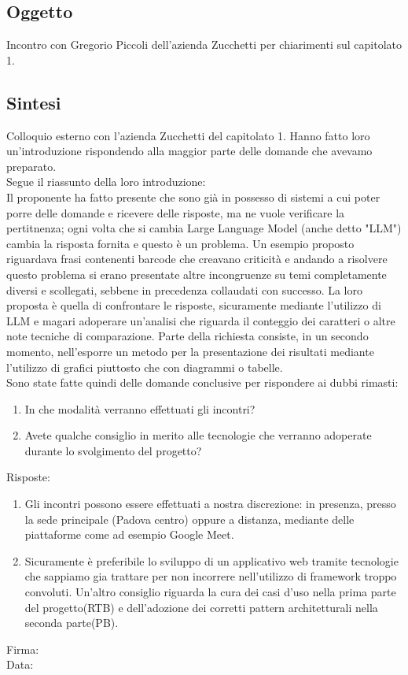 \documentclass[12pt]{article}
\begin{document}
\subsection{Oggetto}
Incontro con Gregorio Piccoli dell'azienda Zucchetti per chiarimenti sul capitolato 1.\\
\subsection{Sintesi}
Colloquio esterno con l'azienda Zucchetti del capitolato 1. Hanno fatto loro un'introduzione rispondendo alla maggior parte delle domande che avevamo preparato.\\
\vspace{2mm}
Segue il riassunto della loro introduzione:\\
\vspace{2mm}
Il proponente ha fatto presente che sono già in possesso di sistemi a cui poter porre delle domande e ricevere delle risposte, ma ne vuole verificare la pertitnenza; ogni volta che si cambia Large Language Model (anche detto "LLM") cambia la risposta fornita e questo è un problema.\newline 
Un esempio proposto riguardava frasi contenenti barcode che creavano criticità e andando a risolvere questo problema si erano presentate altre incongruenze su temi completamente diversi e scollegati, sebbene in precedenza collaudati con successo. La loro proposta è quella di confrontare le risposte, sicuramente mediante l'utilizzo di LLM e magari adoperare un'analisi che riguarda il conteggio dei caratteri o altre note tecniche di comparazione. Parte della richiesta consiste, in un secondo momento, nell'esporre un metodo per la presentazione dei risultati mediante l'utilizzo di grafici piuttosto che con diagrammi o tabelle.\\
\vspace{2mm}
Sono state fatte quindi delle domande conclusive per rispondere ai dubbi rimasti:
\begin{enumerate}
\item In che modalità verranno effettuati gli incontri?
\item Avete qualche consiglio in merito alle tecnologie che verranno adoperate durante lo svolgimento del progetto?
\end{enumerate}

\pagebreak
Risposte:
\begin{enumerate}
\item Gli incontri possono essere effettuati a nostra discrezione: in presenza, presso la sede principale (Padova centro) oppure a distanza, mediante delle piattaforme come ad esempio Google Meet.
\item Sicuramente è preferibile lo sviluppo di un applicativo web tramite tecnologie che sappiamo gia trattare per non incorrere nell'utilizzo di framework troppo convoluti. Un'altro consiglio riguarda la cura dei casi d'uso nella prima parte del progetto(RTB) e dell'adozione dei corretti pattern architetturali nella seconda parte(PB).
\end{enumerate}

\vfill
\begin{minipage}{10cm}
Firma: \hrulefill \\
\vspace{2mm}
Data: \dotfill
\end{minipage}
\end{document}
